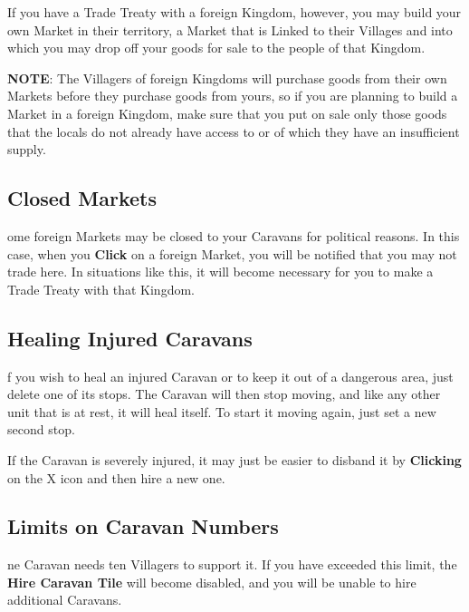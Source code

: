 If you have a Trade Treaty with a foreign Kingdom, however, you may build your own Market in their territory, a Market that is Linked to their Villages and into which you may drop off your goods for sale to the people of that Kingdom.

\textbf{NOTE}: The Villagers of foreign Kingdoms will purchase goods from their own Markets before they purchase goods from yours, so if you are planning to build a Market in a foreign Kingdom, make sure that you put on sale only those goods that the locals do not already have access to or of which they have an insufficient supply.

\subsection{\textsf{Closed Markets}}


ome foreign Markets may be closed to your Caravans for political reasons. In this case, when you \textbf{Click} on a foreign Market, you will be notified that you may not trade here. In situations like this, it will become necessary for you to make a Trade Treaty with that Kingdom.

\subsection{\textsf{Healing Injured Caravans}}


f you wish to heal an injured Caravan or to keep it out of a dangerous area, just delete one of its stops. The Caravan will then stop moving, and like any other unit that is at rest, it will heal itself. To start it moving again, just set a new second stop.

If the Caravan is severely injured, it may just be easier to disband it by \textbf{Clicking} on the X icon and then hire a new one.

\subsection{\textsf{Limits on Caravan Numbers}}


ne Caravan needs ten Villagers to support it. If you have exceeded this limit, the \textbf{Hire Caravan Tile} will become disabled, and you will be unable to hire additional Caravans.

